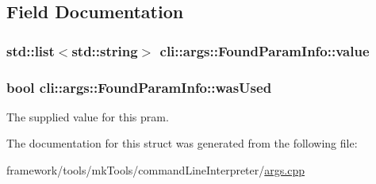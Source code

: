 \subsection{Field Documentation}
\subsubsection[{\texorpdfstring{value}{value}}]{\setlength{\rightskip}{0pt plus 5cm}std\+::list$<$std\+::string$>$ cli\+::args\+::\+Found\+Param\+Info\+::value}\hypertarget{structcli_1_1args_1_1_found_param_info_a442cf495af35be19f31e08aac4265582}{}\label{structcli_1_1args_1_1_found_param_info_a442cf495af35be19f31e08aac4265582}
\subsubsection[{\texorpdfstring{was\+Used}{wasUsed}}]{\setlength{\rightskip}{0pt plus 5cm}bool cli\+::args\+::\+Found\+Param\+Info\+::was\+Used}\hypertarget{structcli_1_1args_1_1_found_param_info_ae812e073354373c73b15032188b0653b}{}\label{structcli_1_1args_1_1_found_param_info_ae812e073354373c73b15032188b0653b}


The supplied value for this pram. 



The documentation for this struct was generated from the following file\+:\begin{DoxyCompactItemize}
\item 
framework/tools/mk\+Tools/command\+Line\+Interpreter/\hyperlink{args_8cpp}{args.\+cpp}\end{DoxyCompactItemize}
